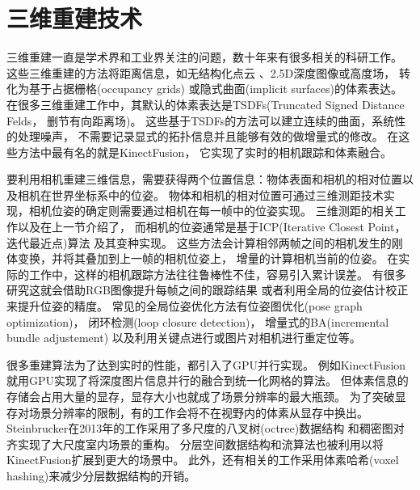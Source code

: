 \section{三维重建技术}\label{reconstruction}
三维重建一直是学术界和工业界关注的问题，数十年来有很多相关的科研工作。
这些三维重建的方法将距离信息，如无结构化点云\cite{henry2010rgb}\cite{keller2013real}
\cite{whelan2015elasticfusion}、2.5D深度图像\cite{meilland2013unifying}或高度场\cite{gallup20103d}，
转化为基于占据栅格(occupancy grids)\cite{elfes1987sensor}
或隐式曲面(implicit surfaces)的体素表达\cite{curless1996volumetric}。
在很多三维重建工作中，其默认的体素表达是TSDFs(Truncated Signed Distance Felds，
删节有向距离场)\cite{fioraio2015large}\cite{fuhrmann2014floating}。
这些基于TSDFs的方法可以建立连续的曲面，系统性的处理噪声，
不需要记录显式的拓扑信息并且能够有效的做增量式的修改。
在这些方法中最有名的就是KinectFusion\cite{izadi2011kinectfusion}\cite{newcombe2011kinectfusion}，
它实现了实时的相机跟踪和体素融合。

要利用相机重建三维信息，需要获得两个位置信息：物体表面和相机的相对位置以及相机在世界坐标系中的位姿。
物体和相机的相对位置可通过三维测距技术实现，相机位姿的确定则需要通过相机在每一帧中的位姿实现。
三维测距的相关工作以及在上一节介绍了，
而相机的位姿通常是基于ICP(Iterative Closest Point，迭代最近点)算法
\cite{besl1992method}及其变种实现。
这些方法会计算相邻两帧之间的相机发生的刚体变换，并将其叠加到上一帧的相机位姿上，
增量的计算相机当前的位姿。
在实际的工作中，这样的相机跟踪方法往往鲁棒性不佳，容易引入累计误差。
有很多研究这就会借助RGB图像提升每帧之间的跟踪结果\cite{whelan2013robust}
或者利用全局的位姿估计校正来提升位姿的精度。
常见的全局位姿优化方法有位姿图优化(pose graph optimization)\cite{steinbrucker2013large}，
闭环检测(loop closure detection)\cite{whelan2013deformation}，
增量式的BA(incremental bundle adjustement)\cite{fioraio2015large}
以及利用关键点进行或图片对相机进行重定位等。

很多重建算法为了达到实时的性能，都引入了GPU并行实现。
例如KinectFusion\cite{izadi2011kinectfusion}就用GPU实现了将深度图片信息并行的融合到统一化网格的算法。
但体素信息的存储会占用大量的显存，显存大小也就成了场景分辨率的最大瓶颈。
为了突破显存对场景分辨率的限制，有的工作会将不在视野内的体素从显存中换出\cite{roth2012moving}。
Steinbrucker在2013年的工作\cite{steinbrucker2013large}采用了多尺度的八叉树(octree)数据结构
和稠密图对齐实现了大尺度室内场景的重构。
分层空间数据结构和流算法也被利用以将KinectFusion扩展到更大的场景中\cite{chen2013scalable}。
此外，还有相关的工作\cite{niessner2013real}采用体素哈希(voxel hashing)来减少分层数据结构的开销。 